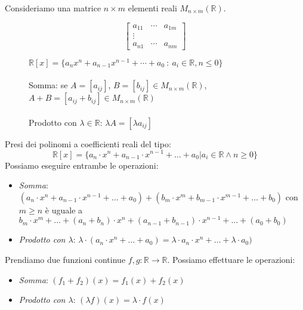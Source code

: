 \begin{example}[Matrici]
Consideriamo una matrice $n \times m$ elementi reali $M_{n\times m}(\mathbb{R})$.
\begin{figure}[h!]
    \begin{minipage}{.2\linewidth}
    \vspace{-10pt}
    \centering
    \[
    \begin{bmatrix}
    a_{11} & \cdots & a_{1m}\\
    \vdots \\
    a_{n1} & \cdots & a_{nm}
    \end{bmatrix}
    \]
    \end{minipage}
    \begin{minipage}{.75\linewidth}
    $\mathbb{R}[x] = \{a_nx^n + a_{n-1}x^{n-1} + \cdots + a_0 \: : \: a_i \in \mathbb{R}, n \leq 0\}$\\\\
    Somma: se $A = [a_{ij}]$, $B = [b_{ij}] \in M_{n\times m}(\mathbb{R})$, $A + B = [a_{ij} + b_{ij}] \in M_{n\times m}(\mathbb{R})$\\\\
    Prodotto con $\lambda \in \mathbb{R}$: $\lambda A = [\lambda a_{ij}]$
    \end{minipage}
\end{figure}
\end{example}

\begin{example}[Polinomi]
	Presi dei polinomi a coefficienti reali del tipo:
	\begin{equation*}
		\mathbb{R}[x] = \{a_n \cdot x^n + a_{n-1} \cdot x^{n-1} + \ldots + a_0 \vert a_i \in \mathbb{R} \wedge n \geq 0\}
	\end{equation*}
	Possiamo eseguire entrambe le operazioni:
	\begin{itemize}
		\item \emph{Somma}: $(a_n \cdot x^n + a_{n-1} \cdot x^{n-1} + \ldots + a_0) + (b_m \cdot x^m + b_{m-1} \cdot x^{m-1} + \ldots + b_0)$ con $m \geq n$ è uguale a $b_m \cdot x^m + \ldots + (a_n + b_n) \cdot x^n + (a_{n-1} + b_{n-1}) \cdot x^{n-1} + \ldots + (a_0 + b_0)$
		\item  \emph{Prodotto con $\lambda$}: $\lambda \cdot (a_n \cdot x^n + \ldots + a_0) = \lambda \cdot a_n \cdot x^n + \ldots + \lambda \cdot a_0)$ 
	\end{itemize}
\end{example}

\begin{example}[Funzioni]
Prendiamo due funzioni continue $f, g: \mathbb{R}\to \mathbb{R}$. Possiamo effettuare le operazioni:
\begin{itemize}
	\item \emph{Somma}: $(f_1 + f_2)(x) = f_1(x) + f_2(x)$
	\item \emph{Prodotto con $\lambda$}: $(\lambda f)(x) = \lambda \cdot f(x)$
\end{itemize}
\end{example}

